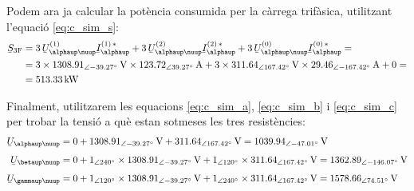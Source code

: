 \begin{exemple}
Podem ara ja calcular la pot\`{e}ncia consumida per la c\`{a}rrega
trif\`{a}sica, utilitzant l'equaci\'{o} \eqref{eq:c_sim_s}:
\[
\begin{split}
\cmplx{S}\ped{3F} &=  3\, \cmplx{U}_{\alphaup\nuup}^{(1)}
\cmplx{I}_\alphaup^{(1)\,*} + 3\, \cmplx{U}_{\alphaup\nuup}^{(2)}
\cmplx{I}_\alphaup^{(2)\,*} +  3\,
\cmplx{U}_{\alphaup\nuup}^{(0)}  \cmplx{I}_\alphaup^{(0)\,*} = \\
&= 3 \times \SIpd{1308,91}{-39,27}{V} \times
\SIpd{123,72}{39,27}{A} + 3 \times
\SIpd{311,64}{167,42}{V} \times \SIpd{29,46}{-167,42}{A} + 0 = \\
&= \SI{513,33}{kW}
\end{split}
\]

Finalment, utilitzarem les equacions \eqref{eq:c_sim_a},
\eqref{eq:c_sim_b} i \eqref{eq:c_sim_c} per trobar la tensi\'{o} a qu\`{e}
estan sotmeses les tres resist\`{e}ncies:
\begin{align*}
    \cmplx{U}_{\alphaup\nuup} &= 0 + \SIpd{1308,91}{-39,27}{V} +
    \SIpd{311,64}{167,42}{V}  =
    \SIpd{1039,94}{-47,01}{V} \\[1ex]
    \cmplx{U}_{\betaup\nuup} &= 0 + \numpd{1}{240} \times
    \SIpd{1308,91}{-39,27}{V} +
    \numpd{1}{120} \times
    \SIpd{311,64}{167,42}{V}  =
    \SIpd{1362,89}{-146,07}{V}    \\[1ex]
    \cmplx{U}_{\gammaup\nuup} &= 0 + \numpd{1}{120} \times
    \SIpd{1308,91}{-39,27}{V} +
    \numpd{1}{240} \times \SIpd{311,64}{167,42}{V}  =
    \SIpd{1578,66}{74,51}{V}
\end{align*}
\end{exemple}
